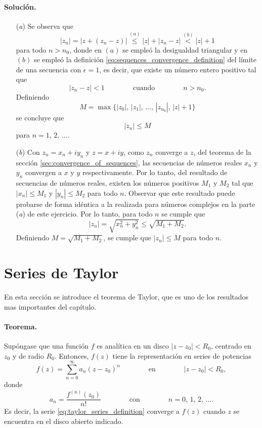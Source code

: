 \documentclass[a4paper]{report}
\begin{document}
\paragraph{Solución.} 
\begin{enumerate}
 \item[(\textit{a})] Se observa que 
 \[
  |z_n|=|z+(z_n-z)|\overset{(a)}{\leq}|z|+|z_n-z|\overset{(b)}{<}|z|+1
 \]
 para todo \(n>n_0\), donde en \((a)\) se empleó la desigualdad triangular y en \((b)\) se empleó la definición \ref{eq:sequences_convergence_definition} del límite de una secuencia con \(\epsilon=1\), es decir, que existe un número entero positivo tal que 
 \[
  |z_n-z|<1
 \qquad\qquad 
 \textrm{cuando}
 \qquad\qquad
 n>n_0. 
 \]
 Definiendo 
 \[
  M=\max\{|z_0|,\,|z_1|,\,\dots,\,|z_{n_0}|,\,|z|+1\}
 \]
 se concluye que 
 \[
  |z_n|\leq M
 \]
 para \(n=1,\,2,\,\dots\).
 \item[(\textit{b})] Con \(z_n=x_n+iy_n\) y \(z=x+iy\), como \(z_n\) converge a \(z\), del teorema de la sección \ref{sec:convergence_of_sequences}, las secuencias de números reales \(x_n\) y \(y_n\) convergen a \(x\) y \(y\) respectivamente. Por lo tanto, del resultado de secuencias de números reales, existen los números positivos \(M_1\) y \(M_2\) tal que \(|x_n|\leq M_1\) y \(|y_n|\leq M_2\) para todo \(n\). Observar que este resultado puede probarse de forma idéntica a la realizada para números complejos en la parte (\textit{a}) de este ejercicio. Por lo tanto, para todo \(n\) se cumple que 
 \[
  |z_n|=\sqrt{x_n^2+y_n^2}\leq\sqrt{M_1+M_2}.
 \]
 Definiendo \(M=\sqrt{M_1+M_2}\), se cumple que \(|z_n|\leq M\) para todo \(n\).
\end{enumerate}

\section{Series de Taylor}\label{sec:taylor_series}

En esta sección se introduce el teorema de Taylor, que es uno de los resultados mas importantes del capítulo.

\paragraph{Teorema.} Supóngase que una función \(f\) es analítica en un disco \(|z-z_0|<R_0\), centrado en \(z_0\) y de radio \(R_0\). Entonces, \(f(z)\) tiene la representación en series de potencias
\begin{equation}\label{eq:taylor_series_definition}
 f(z)=\sum_{n=0}^\infty a_n(z-z_0)^n
 \qquad\qquad\textrm{en}\qquad\qquad
 |z-z_0|<R_0,
\end{equation}
donde
\begin{equation}\label{eq:taylor_series_an_definition}
 a_n=\frac{f^{(n)}(z_0)}{n!}
 \qquad\qquad\textrm{con}\qquad\qquad
 n=0,\,1,\,2,\,\dots.
\end{equation}
Es decir, la serie \ref{eq:taylor_series_definition} converge a \(f(z)\) cuando \(z\) se encuentra en el disco abierto indicado. 
\end{document}

